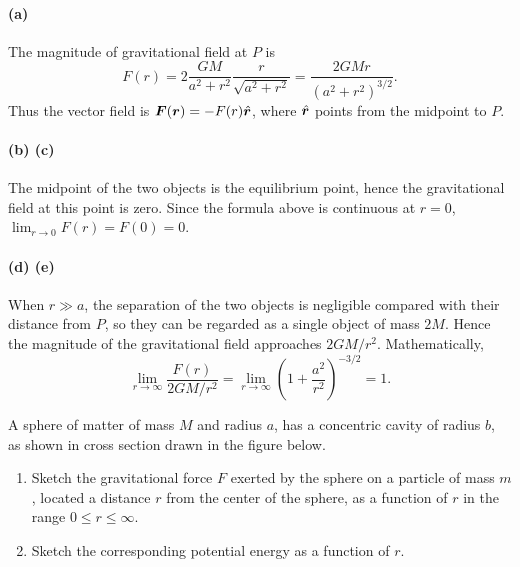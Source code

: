 \documentclass{article}
\begin{document}
\begin{solution}
	\paragraph{(a)} The magnitude of gravitational field at $P$ is
	\[ F(r) = 2 \frac{GM}{a^2 + r^2} \frac{r}{\sqrt{a^2 + r^2}} = \frac{2GM r}{(a^2 + r^2)^{3/2}}. \]
	Thus the vector field is $\boldsymbol{F}(\boldsymbol{r}) = -F(r)\hat{\boldsymbol{r}}$, where $\hat{\boldsymbol{r}}$ points from the midpoint to $P$.

	\paragraph{(b) (c)} The midpoint of the two objects is the equilibrium point, hence the gravitational field at this point is zero. Since the formula above is continuous at $r=0$, $\lim_{r \to 0} F(r) = F(0) = 0$.

	\paragraph{(d) (e)} When $r \gg a$, the separation of the two objects is negligible compared with their distance from $P$, so they can be regarded as a single object of mass $2M$. Hence the magnitude of the gravitational field approaches $2GM/r^2$. Mathematically,
	\[ \lim_{r \to \infty} \frac{F(r)}{2GM/r^2} = \lim_{r \to \infty} \left(1 + \frac{a^2}{r^2}\right)^{-3/2} = 1. \]
\end{solution}



\Needspace{7cm}
\begin{problem}
A sphere of matter of mass $M$ and radius $a$, has a concentric cavity of radius $b$, as shown in cross section drawn in the figure below.
\begin{enumerate}
  \item[(a)] Sketch the gravitational force $F$ exerted by the sphere on a particle of mass $m$, located a distance $r$ from the center of the sphere, as a function of $r$ in the range $0 \le r \le \infty$.
  \item[(b)] Sketch the corresponding potential energy as a function of $r$.
\end{enumerate}
\begin{center}
  
\end{center}
\end{problem}
\end{document}
